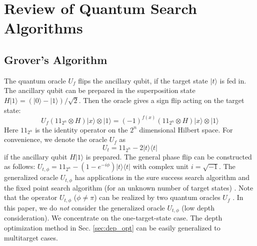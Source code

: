 \documentclass[%
 twocolumn,
 10pt,
 superscriptaddress,
 longbibliography,
 amsmath,amssymb,
 aps,
 pra,
floatfix,
]{revtex4-1}
\begin{document}
\section{\label{sec:Grover}Review of Quantum Search Algorithms}

\subsection{\label{subsec:Grover}Grover's Algorithm}

The quantum oracle $U_f$ flips the ancillary qubit, if the target state $|t\rangle$ is fed in. The ancillary qubit can be prepared in the superposition state $H|1\rangle = (|0\rangle-|1\rangle)/\sqrt 2$. Then the oracle gives a sign flip acting on the target state:
\begin{equation}
	U_f(1\!\!1_{2^n}\otimes H)|x\rangle\otimes|1\rangle = (-1)^{f(x)}(1\!\!1_{2^n}\otimes H)|x\rangle\otimes|1\rangle
\end{equation}
Here $1\!\!1_{2^n}$ is the identity operator on the $2^n$ dimensional Hilbert space. For convenience, we denote the oracle $U_f$ as
\begin{equation}
	\label{def U t}
	U_t=1\!\!1_{2^n}-2|t\rangle\langle t|
\end{equation}
if the ancillary qubit $H|1\rangle$ is prepared. The general phase flip can be constructed as follows: $U_{t,\phi}=1\!\!1_{2^n}-(1-e^{-i\phi})|t\rangle\langle t|$ with complex unit $i=\sqrt{-1}$. The generalized oracle $U_{t,\phi}$ has applications in the sure success search algorithm \cite{BHMT00,MTB18} and the fixed point search algorithm (for an unknown number of target states) \cite{YLC14}. Note that the operator $U_{t,\phi}$ ($\phi\neq \pi$) can be realized by two quantum oracles $U_f$ \cite{YLC14}. In this paper, we do \textit{not} consider the generalized oracle $U_{t,\phi}$ (low depth consideration). We concentrate on the one-target-state case. The depth optimization method in Sec. \ref{sec:dep_opt} can be easily generalized to multitarget cases.
\end{document}
